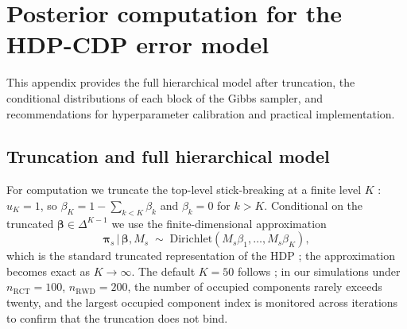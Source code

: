 \documentclass[11pt]{article}
\theoremstyle{plain}
\theoremstyle{definition}
\theoremstyle{remark}
\newcommand{\1}{\mathds{1}}
\newcommand{\given}{\,|\,}
\begin{document}

\appendix

\section{Posterior computation for the HDP-CDP error model}
\label{app:hdp-sampler}

This appendix provides the full hierarchical model after truncation, the conditional distributions of each block of the Gibbs sampler, and recommendations for hyperparameter calibration and practical implementation.

\subsection{Truncation and full hierarchical model}
\label{app:hdp-truncated}

For computation we truncate the top-level stick-breaking at a finite level $K$ \citep{ishwaran2001gibbs}: $u_K = 1$, so $\beta_K = 1 - \sum_{k < K} \beta_k$ and $\beta_k = 0$ for $k > K$. Conditional on the truncated $\bm{\beta} \in \Delta^{K-1}$ we use the finite-dimensional approximation
\begin{equation}
\bm{\pi}_s \given \bm{\beta}, M_s \;\sim\; \mathrm{Dirichlet}(M_s \beta_1, \ldots, M_s \beta_K),
\label{eq:hdp-pi-prior}
\end{equation}
which is the standard truncated representation of the HDP \citep{teh2006hierarchical, wang2009variational}; the approximation becomes exact as $K \to \infty$. The default $K = 50$ follows \citet{henderson2020individualized}; in our simulations under $n_{\mathrm{RCT}} = 100$, $n_{\mathrm{RWD}} = 200$, the number of occupied components rarely exceeds twenty, and the largest occupied component index is monitored across iterations to confirm that the truncation does not bind.
\end{document}
